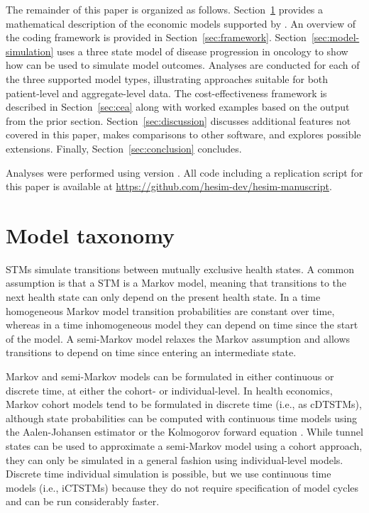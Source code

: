 \documentclass[article, nojss]{jss}\usepackage[]{graphicx}\usepackage[]{color}
\begin{document}
The remainder of this paper is organized as follows. Section~\ref{sec:model-taxonomy} provides a mathematical description of the economic models supported by . An overview of the coding framework is provided in Section~\ref{sec:framework}. Section~\ref{sec:model-simulation} uses a three state model of disease progression in oncology to show how  can be used to simulate model outcomes. Analyses are conducted for each of the three supported model types, illustrating approaches suitable for both patient-level and aggregate-level data. The cost-effectiveness framework is described in Section~\ref{sec:cea} along with worked examples based on the output from the prior section. Section~\ref{sec:discussion} discusses additional features not covered in this paper, makes comparisons to other software, and explores possible extensions. Finally, Section~\ref{sec:conclusion} concludes. 

Analyses were performed using  version . All code including a replication  script for this paper is available at \url{https://github.com/hesim-dev/hesim-manuscript}.

\section{Model taxonomy} \label{sec:model-taxonomy}
STMs simulate transitions between mutually exclusive health states. A common assumption is that a STM is a Markov model, meaning that transitions to the next health state can only depend on the present health state. In a time homogeneous Markov model transition probabilities are constant over time, whereas in a time inhomogeneous model they can depend on time since the start of the model. A semi-Markov model relaxes the Markov assumption and allows transitions to depend on time since entering an intermediate state.

Markov and semi-Markov models can be formulated in either continuous or discrete time, at either the cohort- or individual-level. In health economics, Markov cohort models tend to be formulated in discrete time (i.e., as cDTSTMs), although state probabilities can be computed with continuous time models using the Aalen-Johansen estimator \citep{aalen1978empirical} or the Kolmogorov forward equation \citep{cox1977theory}. While tunnel states can be used to approximate a semi-Markov model using a cohort approach, they can only be simulated in a general fashion using individual-level models. Discrete time individual simulation is possible, but we use continuous time models (i.e., iCTSTMs) because they do not require specification of model cycles and can be run considerably faster. 
\end{document}
